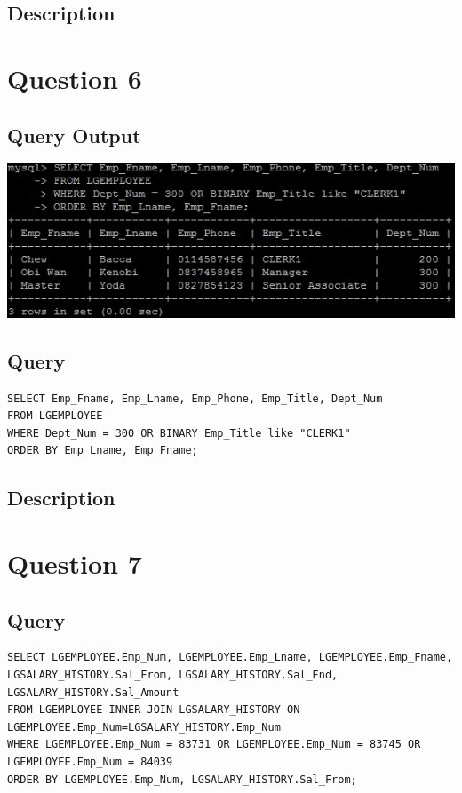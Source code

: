 \documentclass[a4paper,10pt]{article}
\begin{document}
\subsection{Description}
\section*{Question 6}
\subsection{Query Output}
           \includegraphics{Queries/Question_6/Q6_screenshot.jpg}
 \subsection{Query}
          \lstset{
            language=SQL,
            breaklines=true
            }
        \begin{lstlisting}[frame=single]
        SELECT Emp_Fname, Emp_Lname, Emp_Phone, Emp_Title, Dept_Num
FROM LGEMPLOYEE
WHERE Dept_Num = 300 OR BINARY Emp_Title like "CLERK1"
ORDER BY Emp_Lname, Emp_Fname;

        \end{lstlisting}
\subsection{Description}
\section*{Question 7}
 \subsection{Query}
          \lstset{
            language=SQL,
            breaklines=true
            }
        \begin{lstlisting}[frame=single]
        SELECT LGEMPLOYEE.Emp_Num, LGEMPLOYEE.Emp_Lname, LGEMPLOYEE.Emp_Fname, LGSALARY_HISTORY.Sal_From, LGSALARY_HISTORY.Sal_End, LGSALARY_HISTORY.Sal_Amount
FROM LGEMPLOYEE INNER JOIN LGSALARY_HISTORY ON LGEMPLOYEE.Emp_Num=LGSALARY_HISTORY.Emp_Num
WHERE LGEMPLOYEE.Emp_Num = 83731 OR LGEMPLOYEE.Emp_Num = 83745 OR LGEMPLOYEE.Emp_Num = 84039
ORDER BY LGEMPLOYEE.Emp_Num, LGSALARY_HISTORY.Sal_From;

        \end{lstlisting}
\end{document}
